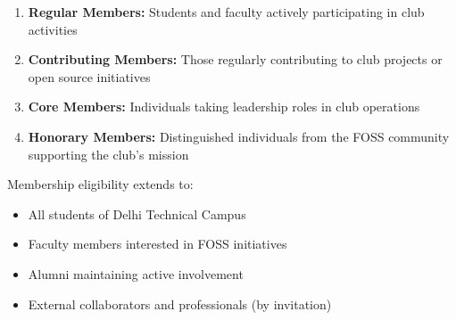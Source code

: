 \documentclass[12pt,a4paper]{article}
\begin{document}
\begin{enumerate}
    \item \textbf{Regular Members:} Students and faculty actively participating in club activities
    \item \textbf{Contributing Members:} Those regularly contributing to club projects or open source initiatives
    \item \textbf{Core Members:} Individuals taking leadership roles in club operations
    \item \textbf{Honorary Members:} Distinguished individuals from the FOSS community supporting the club's mission
\end{enumerate}

Membership eligibility extends to:
\begin{itemize}
    \item All students of Delhi Technical Campus
    \item Faculty members interested in FOSS initiatives
    \item Alumni maintaining active involvement
    \item External collaborators and professionals (by invitation)
\end{itemize}
\end{document}
